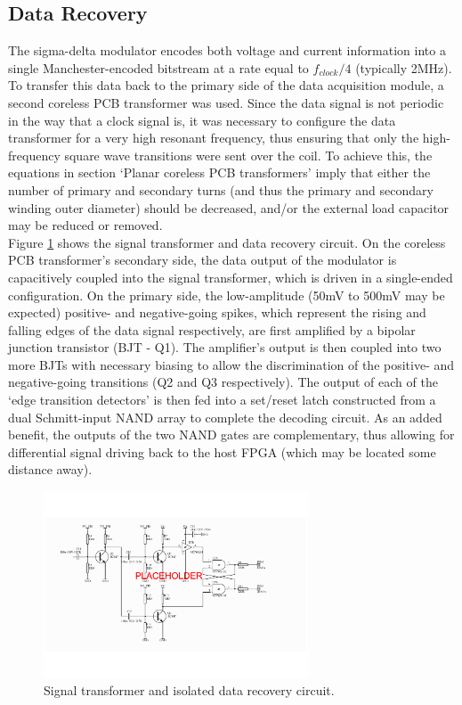 \documentclass[conference]{IEEEtran}
\begin{document}
	\subsection{Data Recovery}
	The sigma-delta modulator encodes both voltage and current information into a single Manchester-encoded bitstream at a rate equal to $ f_{clock}/4 $ (typically 2MHz).  To transfer this data back to the primary side of the data acquisition module, a second coreless PCB transformer was used.  Since the data signal is not periodic in the way that a clock signal is, it was necessary to configure the data transformer for a very high resonant frequency, thus ensuring that only the high-frequency square wave transitions were sent over the coil.  To achieve this, the equations in section `Planar coreless PCB transformers' imply that either the number of primary and secondary turns (and thus the primary and secondary winding outer diameter) should be decreased, and/or the external load capacitor may be reduced or removed. \\
	Figure \ref{fig:TFdat} shows the signal transformer and data recovery circuit.  On the coreless PCB transformer's secondary side, the data output of the modulator is capacitively coupled into the signal transformer, which is driven in a single-ended configuration.  On the primary side, the low-amplitude (50mV to 500mV may be expected) positive- and negative-going spikes, which represent the rising and falling edges of the data signal respectively, are first amplified by a bipolar junction transistor (BJT - Q1).  The amplifier's output is then coupled into two more BJTs with necessary biasing to allow the discrimination of the positive- and negative-going transitions (Q2 and Q3 respectively).  The output of each of the `edge transition detectors' is then fed into a set/reset latch constructed from a dual Schmitt-input NAND array to complete the decoding circuit.  As an added benefit, the outputs of the two NAND gates are complementary, thus allowing for differential signal driving back to the host FPGA (which may be located some distance away).
%
	\begin{figure}[t]
		\centering
		\includegraphics[width=0.7\textwidth]{./img/TFdat_BW}
		\caption{Signal transformer and isolated data recovery circuit.}
		\label{fig:TFdat}
	\end{figure}
%	
\end{document}
